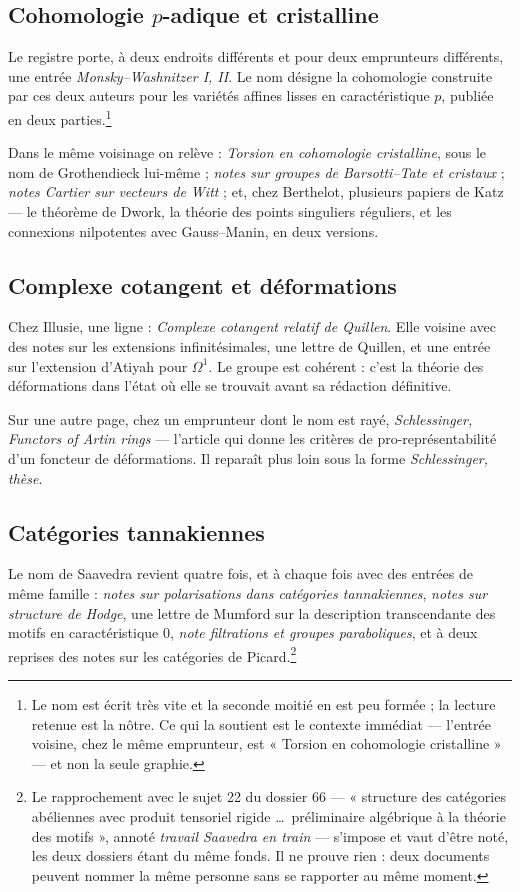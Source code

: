 \documentclass[11pt,a4paper]{article}
\begin{document}
\subsection*{Cohomologie $p$-adique et cristalline}

Le registre porte, à deux endroits différents et pour deux emprunteurs
différents, une entrée \emph{Monsky--Washnitzer I, II}. Le nom désigne la
cohomologie construite par ces deux auteurs pour les variétés affines lisses en
caractéristique $p$, publiée en deux parties.\footnote{Le nom est écrit très
vite et la seconde moitié en est peu formée ; la lecture retenue est la nôtre.
Ce qui la soutient est le contexte immédiat --- l'entrée voisine, chez le même
emprunteur, est « Torsion en cohomologie cristalline » --- et non la seule
graphie.}

Dans le même voisinage on relève : \emph{Torsion en cohomologie cristalline},
sous le nom de Grothendieck lui-même ; \emph{notes sur groupes de Barsotti--Tate
et cristaux} ; \emph{notes Cartier sur vecteurs de Witt} ; et, chez Berthelot,
plusieurs papiers de Katz --- le théorème de Dwork, la théorie des points
singuliers réguliers, et les connexions nilpotentes avec Gauss--Manin, en deux
versions.

\subsection*{Complexe cotangent et déformations}

Chez Illusie, une ligne : \emph{Complexe cotangent relatif de Quillen}. Elle
voisine avec des notes sur les extensions infinitésimales, une lettre de
Quillen, et une entrée sur l'extension d'Atiyah pour $\Omega^{1}$. Le groupe
est cohérent : c'est la théorie des déformations dans l'état où elle se trouvait
avant sa rédaction définitive.

Sur une autre page, chez un emprunteur dont le nom est rayé,
\emph{Schlessinger, Functors of Artin rings} --- l'article qui donne les
critères de pro-représentabilité d'un foncteur de déformations. Il reparaît plus
loin sous la forme \emph{Schlessinger, thèse}.

\subsection*{Catégories tannakiennes}

Le nom de Saavedra revient quatre fois, et à chaque fois avec des entrées de
même famille : \emph{notes sur polarisations dans catégories tannakiennes},
\emph{notes sur structure de Hodge}, une lettre de Mumford sur la description
transcendante des motifs en caractéristique 0, \emph{note filtrations et groupes
paraboliques}, et à deux reprises des notes sur les catégories de
Picard.\footnote{Le rapprochement avec le sujet 22 du dossier 66 --- « structure
des catégories abéliennes avec produit tensoriel rigide \ldots\ préliminaire
algébrique à la théorie des motifs », annoté \emph{travail Saavedra en train} ---
s'impose et vaut d'être noté, les deux dossiers étant du même fonds. Il ne
prouve rien : deux documents peuvent nommer la même personne sans se rapporter
au même moment.}
\end{document}
